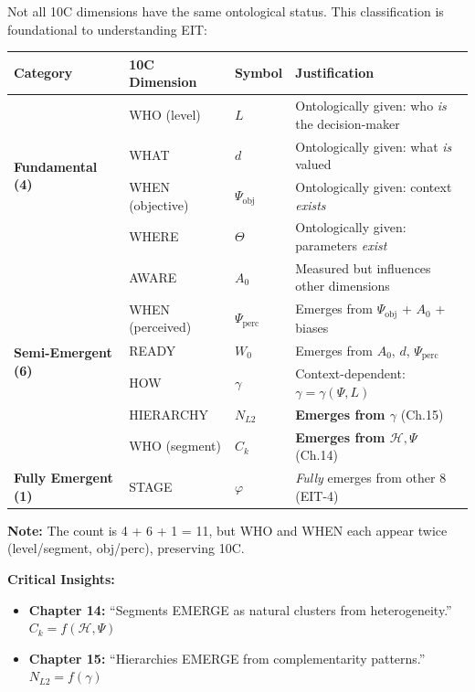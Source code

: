 \begin{tcolorbox}[colback=red!5!white, colframe=red!75!black,
    title=\textbf{Critical: Which 10C Dimensions Are Emergent?}]

Not all 10C dimensions have the same ontological status. This classification is foundational to understanding EIT:

\begin{center}
\renewcommand{\arraystretch}{1.4}
\begin{tabular}{@{}llll@{}}
\toprule
\textbf{Category} & \textbf{10C Dimension} & \textbf{Symbol} & \textbf{Justification} \\
\midrule
\multirow{4}{*}{\textbf{Fundamental (4)}}
    & WHO (level) & $L$ & Ontologically given: who \textit{is} the decision-maker \\
    & WHAT & $d$ & Ontologically given: what \textit{is} valued \\
    & WHEN (objective) & $\Psi_{\text{obj}}$ & Ontologically given: context \textit{exists} \\
    & WHERE & $\Theta$ & Ontologically given: parameters \textit{exist} \\
\midrule
\multirow{6}{*}{\textbf{Semi-Emergent (6)}}
    & AWARE & $A_0$ & Measured but influences other dimensions \\
    & WHEN (perceived) & $\Psi_{\text{perc}}$ & Emerges from $\Psi_{\text{obj}}$ + $A_0$ + biases \\
    & READY & $W_0$ & Emerges from $A_0$, $d$, $\Psi_{\text{perc}}$ \\
    & HOW & $\gamma$ & Context-dependent: $\gamma = \gamma(\Psi, L)$ \\
    & HIERARCHY & $N_{L2}$ & \textbf{Emerges from $\gamma$} (Ch.15) \\
    & WHO (segment) & $C_k$ & \textbf{Emerges from $\mathcal{H}, \Psi$} (Ch.14) \\
\midrule
\textbf{Fully Emergent (1)}
    & STAGE & $\varphi$ & \textit{Fully} emerges from other 8 (EIT-4) \\
\bottomrule
\end{tabular}
\end{center}

\textbf{Note:} The count is 4 + 6 + 1 = 11, but WHO and WHEN each appear twice (level/segment, obj/perc), preserving 10C.

\textbf{Critical Insights:}
\begin{itemize}[nosep]
    \item \textbf{Chapter 14:} ``Segments EMERGE as natural clusters from heterogeneity.'' $C_k = f(\mathcal{H}, \Psi)$
    \item \textbf{Chapter 15:} ``Hierarchies EMERGE from complementarity patterns.'' $N_{L2} = f(\gamma)$
\end{itemize}

\end{tcolorbox}

